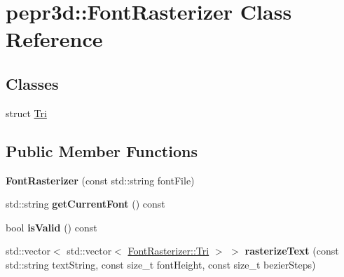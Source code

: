\hypertarget{classpepr3d_1_1_font_rasterizer}{}\section{pepr3d\+::Font\+Rasterizer Class Reference}
\label{classpepr3d_1_1_font_rasterizer}
\subsection*{Classes}
\begin{DoxyCompactItemize}
\item 
struct \mbox{\hyperlink{structpepr3d_1_1_font_rasterizer_1_1_tri}{Tri}}
\end{DoxyCompactItemize}
\subsection*{Public Member Functions}
\begin{DoxyCompactItemize}
\item 
\mbox{\label{classpepr3d_1_1_font_rasterizer_a7099a831f003a1e9f15e3d28918613b7}} 
{\bfseries Font\+Rasterizer} (const std\+::string font\+File)
\item 
\mbox{\label{classpepr3d_1_1_font_rasterizer_acbb4bdd3f6183bebe44bc4bd38321b4d}} 
std\+::string {\bfseries get\+Current\+Font} () const
\item 
\mbox{\label{classpepr3d_1_1_font_rasterizer_a965167ef18771ff5b19f1bcfbb0403e0}} 
bool {\bfseries is\+Valid} () const
\item 
\mbox{\label{classpepr3d_1_1_font_rasterizer_a5632080c9dd7163ca8b3635820083148}} 
std\+::vector$<$ std\+::vector$<$ \mbox{\hyperlink{structpepr3d_1_1_font_rasterizer_1_1_tri}{Font\+Rasterizer\+::\+Tri}} $>$ $>$ {\bfseries rasterize\+Text} (const std\+::string text\+String, const size\+\_\+t font\+Height, const size\+\_\+t bezier\+Steps)
\end{DoxyCompactItemize}

